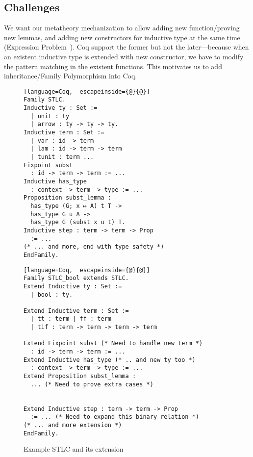 \subsection{Challenges}

We want our metatheory mechanization to allow adding new function/proving new lemmas, and adding new constructors for inductive type at the same time  (Expression Problem~\cite{wadler-ep}). Coq support the former but not the later---because when an existent inductive type is extended with new constructor, we have to modify the pattern matching in the existent functions. This motivates us to add inheritance/Family Polymorphism into Coq. 

\begin{figure}[!htb]
  \begin{minipage}[t]{0.47\linewidth}
\begin{lstlisting}[language=Coq,  escapeinside={@}{@}]
Family STLC.
Inductive ty : Set :=
  | unit : ty
  | arrow : ty -> ty -> ty.
Inductive term : Set := 
  | var : id -> term 
  | lam : id -> term -> term 
  | tunit : term ...
Fixpoint subst 
  : id -> term -> term := ...
Inductive has_type 
  : context -> term -> type := ...
Proposition subst_lemma :
  has_type (G; x ↦ A) t T ->
  has_type G u A ->
  has_type G (subst x u t) T.
Inductive step : term -> term -> Prop 
  := ...
(* ... and more, end with type safety *)
EndFamily.
\end{lstlisting}
  \end{minipage}
  \begin{minipage}[t]{0.47\linewidth}
\begin{lstlisting}[language=Coq,  escapeinside={@}{@}]
Family STLC_bool extends STLC.
Extend Inductive ty : Set :=
  | bool : ty.

Extend Inductive term : Set := 
  | tt : term | ff : term 
  | tif : term -> term -> term -> term

Extend Fixpoint subst (* Need to handle new term *)
  : id -> term -> term := ...
Extend Inductive has_type (* .. and new ty too *)
  : context -> term -> type := ...
Extend Proposition subst_lemma :
  ... (* Need to prove extra cases *)


Extend Inductive step : term -> term -> Prop 
  := ... (* Need to expand this binary relation *)
(* ... and more extension *)
EndFamily.
\end{lstlisting}
  \end{minipage}
  \caption{Example STLC and its extension}\label{fig:STLC-example}
\end{figure}

